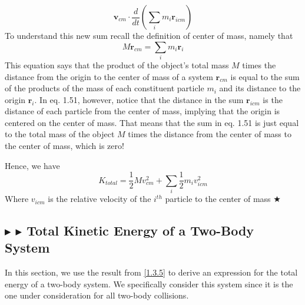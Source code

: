 \begin{equation}
    \mathbf{v}_{cm} \cdot \frac{d}{dt}\left(\sum_i m_i \mathbf{r}_{icm}\right)
\end{equation}
\noindent To understand this new sum recall the definition of center of mass, namely that
\begin{equation*}
    M\mathbf{r}_{cm} = \sum_i m_i\mathbf{r}_i
\end{equation*}
\noindent This equation says that the product of the object's total mass $M$ times the distance from the origin to the center of mass of a system $\mathbf{r}_{cm}$ is equal to the sum of the products of the mass of each constituent particle $m_i$ and its distance to the origin $\mathbf{r}_{i}$. In eq. 1.51, however, notice that the distance in the sum $\mathbf{r}_{icm}$ is the distance of each particle from the center of mass, implying that the origin is centered on the center of mass. That means that the sum in eq. 1.51 is just equal to the total mass of the object $M$ times the distance from the center of mass to the center of mass, which is zero!

\noindent Hence, we have
\begin{equation*}
    K_{total} = \frac12 M v_{cm}^2 + \sum_i \frac12 m_i v_{icm}^2
\end{equation*}
\noindent Where $v_{icm}$ is the relative velocity of the $i^{th}$ particle to the center of mass $\bigstar$

%
%
\subsection{\color{Goldenrod} $\blacktriangleright$ \color{Orchid} $\blacktriangleright$ \color{black} Total Kinetic Energy of a Two-Body System} \label{1.3.6}
In this section, we use the result from \ref{1.3.5} to derive an expression for the total energy of a two-body system. We specifically consider this system since it is the one under consideration for all two-body collisions.

